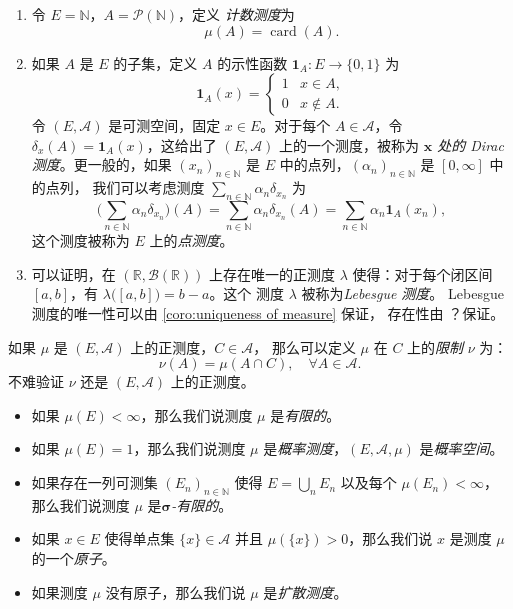 \documentclass[fontset=none]{Notes}
\DeclareMathOperator\card{card}
\begin{document}
\begin{example}[常见的测度]
  \mbox{}
  \begin{enumerate}
    \item 令 $E=\mathbb{N}$，$A=\mathcal{P}(\mathbb{N})$，定义%
    \emph{计数测度}为
    \[
      \mu(A)=\card(A).  
    \]
    \item 如果 $A$ 是 $E$ 的子集，定义 $A$ 的示性函数 $\mathbf{1}_A:E\to\{0,1\}$
    为
    \[
      \mathbf{1}_A(x)=\begin{cases}
        1 & x\in A,\\
        0 & x\notin A.
      \end{cases}  
    \]
    令 $(E,\mathcal{A})$ 是可测空间，固定 $x\in E$。对于每个 $A\in \mathcal{A}$，令
    $\delta_x(A)=\mathbf{1}_A(x)$，这给出了 $(E,\mathcal{A})$ 上的一个测度，被称为
    \emph{$\mathbold x$ 处的 Dirac 测度}。更一般的，如果 $(x_n)_{n\in \mathbb{N}}$
    是 $E$ 中的点列，$(\alpha_n)_{n\in \mathbb{N}}$ 是 $[0,\infty]$ 中的点列，
    我们可以考虑测度 $\sum_{n\in \mathbb{N}}\alpha_n\delta_{x_n}$ 为
    \[
      \biggl(\sum_{n\in \mathbb{N}}\alpha_n\delta_{x_n}\biggr)
      (A)=\sum_{n\in \mathbb{N}}\alpha_n\delta_{x_n}(A)=
      \sum_{n\in \mathbb{N}}\alpha_n\mathbold 1_{A}(x_n),
    \]
    这个测度被称为 $E$ 上的\emph{点测度}。
    \item 可以证明，在 $(\mathbb{R},\mathcal{B}(\mathbb{R}))$ 上存在唯一的正测度 $\lambda$
    使得：对于每个闭区间 $[a,b]$，有 $\lambda\bigl([a,b]\bigr)=b-a$。这个
    测度 $\lambda$ 被称为\emph{Lebesgue 测度}。
    Lebesgue 测度的唯一性可以由 \autoref{coro:uniqueness of measure} 保证，
    存在性由 ？保证。
  \end{enumerate}
\end{example}

如果 $\mu$ 是 $(E,\mathcal{A})$ 上的正测度，$C\in \mathcal{A}$，
那么可以定义 $\mu$ 在 $C$ 上的\emph{限制} $\nu$ 为：
\[
  \nu(A)=\mu(A\cap C),\quad \forall A\in \mathcal{A}.
\]
不难验证 $\nu$ 还是 $(E,\mathcal{A})$ 上的正测度。

\begin{definition}
  \mbox{}
  \begin{itemize}[nosep]
    \item 如果 $\mu(E)<\infty$，那么我们说测度 $\mu$ 是\emph{有限的}。
    \item 如果 $\mu(E)=1$，那么我们说测度 $\mu$ 是\emph{概率测度}，$(E,\mathcal{A},\mu)$ 是\emph{概率空间}。
    \item 如果存在一列可测集 $(E_n)_{n\in \mathbb{N}}$ 使得 $E=\bigcup_n E_n$ 以及每个
    $\mu(E_n)<\infty$，那么我们说测度 $\mu$ 是\emph{$\mathbold\sigma$-有限的}。
    \item 如果 $x\in E$ 使得单点集 $\{x\}\in \mathcal{A}$ 并且 $\mu(\{x\})>0$，那么我们说
    $x$ 是测度 $\mu$ 的一个\emph{原子}。
    \item 如果测度 $\mu$ 没有原子，那么我们说 $\mu$ 是\emph{扩散测度}。
  \end{itemize}
\end{definition}
\end{document}
